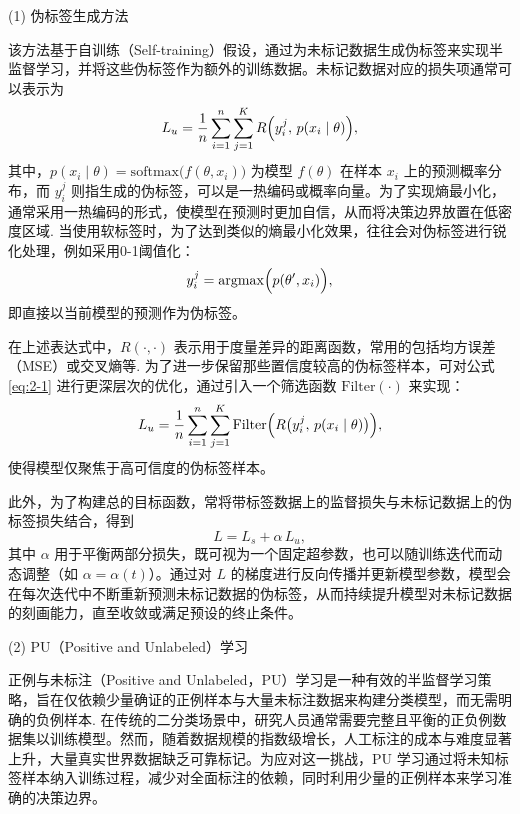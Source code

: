 (1) 伪标签生成方法

该方法基于自训练（Self-training）假设\citep{lee2013pseudo,zhu2005semi}，通过为未标记数据生成伪标签来实现半监督学习，并将这些伪标签作为额外的训练数据。未标记数据对应的损失项通常可以表示为
\begin{equation}\label{eq:2-1}
	L_u = \frac{1}{n} \sum_{i=1}^{n} \sum_{j=1}^{K} R \Bigl( y_i^{j}, \, p(x_i \mid \theta) \Bigr),
\end{equation}
其中，$ p(x_i \mid \theta) = \mathrm{softmax}\bigl(f(\theta, x_i)\bigr) $ 为模型 $ f(\theta) $ 在样本 $ x_i $ 上的预测概率分布，而 $ y_i^{j} $ 则指生成的伪标签，可以是一热编码或概率向量。为了实现熵最小化，通常采用一热编码的形式，使模型在预测时更加自信，从而将决策边界放置在低密度区域\citep{chapelle2009semi}. 当使用软标签时，为了达到类似的熵最小化效果，往往会对伪标签进行锐化处理，例如采用0-1阈值化：
\begin{equation}\label{eq:2-2}
	y_i^{j} = \mathrm{argmax}\Bigl(p(\theta', x_i)\Bigr),
\end{equation}
即直接以当前模型的预测作为伪标签。

在上述表达式中，$ R(\cdot, \cdot) $ 表示用于度量差异的距离函数，常用的包括均方误差（MSE）或交叉熵等\citep{van2020survey}. 为了进一步保留那些置信度较高的伪标签样本，可对公式 \eqref{eq:2-1} 进行更深层次的优化，通过引入一个筛选函数 $\mathrm{Filter}(\cdot)$ 来实现：
\begin{equation}\label{eq:2-3}
	L_u = \frac{1}{n} \sum_{i=1}^{n} \sum_{j=1}^{K} 
	\mathrm{Filter} \Bigl( R \bigl( y_i^{j},\, p(x_i \mid \theta) \bigr) \Bigr),
\end{equation}
使得模型仅聚焦于高可信度的伪标签样本。

此外，为了构建总的目标函数，常将带标签数据上的监督损失与未标记数据上的伪标签损失结合，得到
\begin{equation}\label{eq:2-4}
	L = L_s + \alpha \, L_u,
\end{equation}
其中 $ \alpha $ 用于平衡两部分损失，既可视为一个固定超参数，也可以随训练迭代而动态调整（如 $\alpha = \alpha(t)$）。通过对 $ L $ 的梯度进行反向传播并更新模型参数，模型会在每次迭代中不断重新预测未标记数据的伪标签，从而持续提升模型对未标记数据的刻画能力，直至收敛或满足预设的终止条件。

(2) PU（Positive and Unlabeled）学习

正例与未标注（Positive and Unlabeled，PU）学习是一种有效的半监督学习策略，旨在仅依赖少量确证的正例样本与大量未标注数据来构建分类模型，而无需明确的负例样本\citep{elkan2008learning,mordelet2013bagging}. 在传统的二分类场景中，研究人员通常需要完整且平衡的正负例数据集以训练模型。然而，随着数据规模的指数级增长，人工标注的成本与难度显著上升，大量真实世界数据缺乏可靠标记。为应对这一挑战，PU 学习通过将未知标签样本纳入训练过程，减少对全面标注的依赖，同时利用少量的正例样本来学习准确的决策边界。

